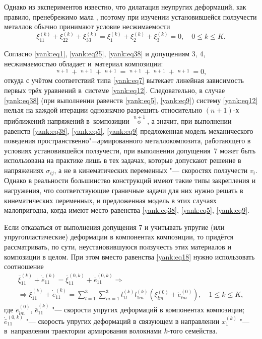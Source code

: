 Однако из экспериментов известно, что дилатация неупругих деформаций, как
правило, пренебрежимо мала \cite{yank:bib3,yank:bib8,yank:bib9}, поэтому при изучении установившейся
ползучести металлов обычно принимают условие несжимаемости \cite{yank:bib3,yank:bib8}
\begin{equation}
\label{yank:eq38}
\xi _{11}^{(k)} +\xi _{22}^{(k)} +\xi
_{33}^{(k)} =\xi _1^{(k)} +\xi _2^{(k)} +\xi _3^{(k)}
=0, \quad 0\le k\le K.
\end{equation}

Согласно \eqref{yank:eq1}, \eqref{yank:eq25}, \eqref{yank:eq38} и допущениям 3, 4, несжимаемостью обладает и~материал композиции:
\[
\mathop {\xi _{11} }\limits^{n+1} +\mathop {\xi _{22}}\limits^{n+1}
+\mathop {\xi _{33} }\limits^{n+1} =\mathop {\xi _1 }\limits^{n+1} +\mathop
{\xi _2 }\limits^{n+1} +\mathop {\xi _3 }\limits^{n+1} =0,
\]
откуда с учётом соответствий типа \eqref{yank:eq7} вытекает линейная зависимость первых трёх уравнений в~системе \eqref{yank:eq12}. 
Следовательно, в случае \eqref{yank:eq38} (при выполнении равенств \eqref{yank:eq5}, \eqref{yank:eq9}) систему \eqref{yank:eq12} нельзя на каждой итерации однозначно разрешить относительно $(n+1)$-х приближений напряжений в~композиции 
$\mathop \sigma \limits^{n+1} $, а значит, при выполнении равенств \eqref{yank:eq38},
\eqref{yank:eq5}, \eqref{yank:eq9} предложенная модель механического поведения пространственно"=армированного металлокомпозита, работающего в условиях установившейся ползучести, при выполнении допущения~7 может быть использована на практике лишь в тех задачах, которые допускают решение в напряжениях $\sigma _{ij} $, а не в кинематических переменных "--- скоростях
ползучести $v_i $. Однако в реальности большинство конструкций имеют такие типы закрепления и нагружения, что соответствующие граничные задачи для них нужно решать в кинематических переменных, и предложенная модель в этих случаях малопригодна, когда имеют место равенства \eqref{yank:eq38}, \eqref{yank:eq5}, \eqref{yank:eq9}.

Если отказаться от выполнения допущения 7 и учитывать упругие (или упругопластические) деформации в компонентах композиции, то придётся  рассматривать, по сути, неустановившуюся ползучесть этих материалов \cite{yank:bib3} и композиции в целом. При этом вместо равенства \eqref{yank:eq18} нужно использовать
соотношение
\begin{multline}
\label{yank:eq39}
\bar {\xi }_{11}^{(k)} +\dot {\bar {e}}_{11}^{(k)} =\bar {\xi
}_{11}^{(0,k)} +\dot {\bar {e}}_{11}^{(0,k)} \Rightarrow \\
 \Rightarrow  \bar {\xi }_{11}^{(k)} +\dot {\bar {e}}_{11}^{(k)}
=\sum\limits_{l=1}^3 \sum\limits_{m=1}^3 l_{1l}^{(k)} l_{1m}^{(k)} \left(\xi _{lm}^{(0)} +\dot {e}_{lm}^{(0)}\right),\quad 1\le k\le K,
\end{multline}
где $\dot {e}_{lm}^{(0)}$, $\dot {\bar {e}}_{11}^{(k)} $ "--- скорости
упругих деформаций в компонентах композиции; \linebreak $\dot {\bar {e}}_{11}^{(0,k)}$
"--- скорость упругих деформаций в связующем в направлении $x_1^{(k)} $ "--- в~направлении траектории армирования волокнами $k$-того семейства.

